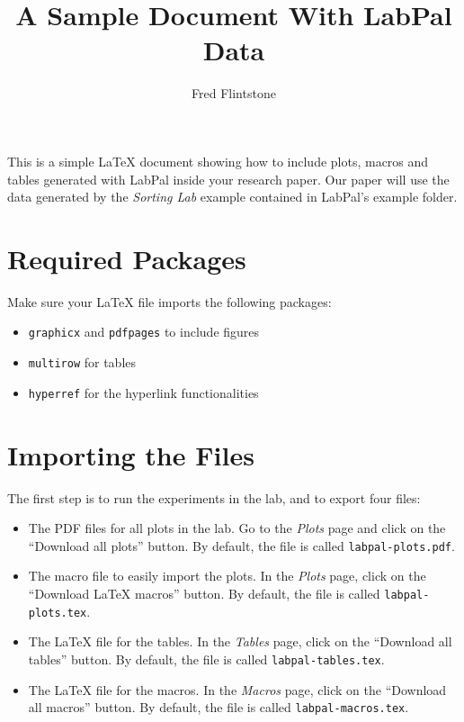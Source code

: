 \documentclass[utf8,twocolumn]{article}
\begin{document}
\title{A Sample Document With LabPal Data}
\author{Fred Flintstone}
\maketitle





This is a simple \LaTeX{} document showing how to include plots, macros and
tables generated with LabPal inside your research paper. Our paper will use the
data generated by the \emph{Sorting Lab} example contained in LabPal's example
folder.

\section*{Required Packages}

Make sure your \LaTeX{} file imports the following packages:

\begin{itemize}
\item \texttt{graphicx} and \texttt{pdfpages} to include figures
\item \texttt{multirow} for tables
\item \texttt{hyperref} for the hyperlink functionalities
\end{itemize}

\section*{Importing the Files}

The first step is to run the experiments in the lab, and to export four files:

\begin{itemize}
\item The PDF files for all plots in the lab. Go to the \textsl{Plots} page and
click on the ``Download all plots'' button. By default, the file is called
\verb+labpal-plots.pdf+.
\item The macro file to easily import the plots. In the \textsl{Plots} page,
click on the ``Download \LaTeX{} macros'' button. By default, the file is called
\verb+labpal-plots.tex+.
\item The \LaTeX{} file for the tables. In the \textsl{Tables} page, click on
the ``Download all tables'' button. By default, the file is called
\verb+labpal-tables.tex+.
\item The \LaTeX{} file for the macros. In the \textsl{Macros} page, click on
the ``Download all macros'' button. By default, the file is called
\verb+labpal-macros.tex+.
\end{itemize}
\end{document}
